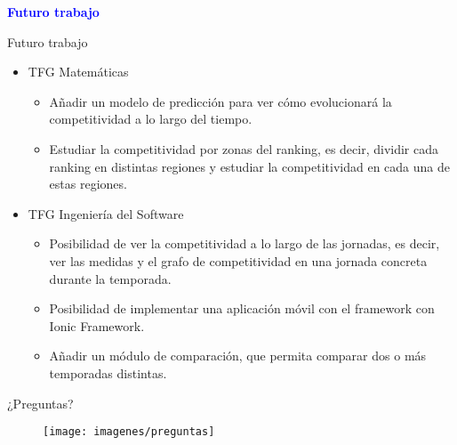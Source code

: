 \documentclass[10pt,hyperref={unicode}]{beamer}
\begin{document}
	\begin{frame}
		\begin{center}
			\Huge\textbf{\textsf{\textcolor{blue}{Futuro trabajo}}}
		\end{center}
	\end{frame}	
	
	
	\begin{frame}{Futuro trabajo}
	
		\begin{itemize}
		\item TFG Matemáticas
		
		\begin{itemize}
					\item Añadir un modelo de predicción para ver cómo evolucionará la competitividad a lo largo del tiempo.
					
					\item Estudiar la competitividad por zonas del ranking, es decir, dividir cada ranking en distintas regiones y estudiar la competitividad en cada una de estas regiones. 
				\end{itemize}
				
		\item TFG Ingeniería del Software
		
			\begin{itemize}
							\item Posibilidad de ver la competitividad a lo largo de las jornadas, es decir, ver las medidas y el grafo de competitividad en una jornada concreta durante la temporada.
												
							\item Posibilidad de implementar una aplicación móvil con el framework con Ionic Framework.
							
							\item Añadir un módulo de comparación, que permita comparar dos o más temporadas distintas.
							
						\end{itemize}
		
		\end{itemize}
		
		
	\end{frame}
	
	
	\begin{frame}{¿Preguntas?}
		\begin{figure}
			\centering
			\texttt{[image: imagenes/preguntas]}
		\end{figure}

	\end{frame}
	
	
\end{document}
